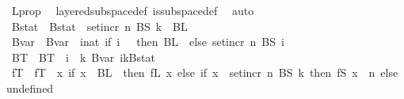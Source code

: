 \begin{isabellebody}
\ L{\isacharunderscore}{\kern0pt}prop\ \isamarkupfalse%
\ layered{\isacharunderscore}{\kern0pt}subspace{\isacharunderscore}{\kern0pt}def\ is{\isacharunderscore}{\kern0pt}subspace{\isacharunderscore}{\kern0pt}def\ \isamarkupfalse%
\ auto\isanewline
\isanewline
\ \ \ \ \isamarkupfalse%
\ Bstat\ \ {\isachardoublequoteopen}Bstat\ {\isasymequiv}\ set{\isacharunderscore}{\kern0pt}incr\ n\ {\isacharparenleft}{\kern0pt}BS\ k{\isacharparenright}{\kern0pt}\ {\isasymunion}\ BL\ {}{\isachardoublequoteclose}\isanewline
\ \ \ \ \isamarkupfalse%
\ Bvar\ \ {\isachardoublequoteopen}Bvar\ {\isasymequiv}\ {\isacharparenleft}{\kern0pt}{\isasymlambda}i{\isacharcolon}{\kern0pt}{\isacharcolon}{\kern0pt}nat{\isachardot}{\kern0pt}\ {\isacharparenleft}{\kern0pt}if\ i\ {\isacharequal}{\kern0pt}\ {}\ then\ BL\ {}\ else\ set{\isacharunderscore}{\kern0pt}incr\ n\ {\isacharparenleft}{\kern0pt}BS\ {\isacharparenleft}{\kern0pt}i\ {\isacharminus}{\kern0pt}\ {}{\isacharparenright}{\kern0pt}{\isacharparenright}{\kern0pt}{\isacharparenright}{\kern0pt}{\isacharparenright}{\kern0pt}{\isachardoublequoteclose}\isanewline
\ \ \ \ \isamarkupfalse%
\ BT\ \ {\isachardoublequoteopen}BT\ {\isasymequiv}\ {\isacharparenleft}{\kern0pt}{\isasymlambda}i\ {\isasymin}\ {\isacharbraceleft}{\kern0pt}{\isachardot}{\kern0pt}{\isachardot}{\kern0pt}{\isacharless}{\kern0pt}k{\isacharplus}{\kern0pt}{}{\isacharbraceright}{\kern0pt}{\isachardot}{\kern0pt}\ Bvar\ i{\isacharparenright}{\kern0pt}{\isacharparenleft}{\kern0pt}{\isacharparenleft}{\kern0pt}k{\isacharplus}{\kern0pt}{}{\isacharparenright}{\kern0pt}{\isacharcolon}{\kern0pt}{\isacharequal}{\kern0pt}Bstat{\isacharparenright}{\kern0pt}{\isachardoublequoteclose}\isanewline
\ \ \ \ \isamarkupfalse%
\ fT\ \ {\isachardoublequoteopen}fT\ {\isasymequiv}\ {\isacharparenleft}{\kern0pt}{\isasymlambda}x{\isachardot}{\kern0pt}\ {\isacharparenleft}{\kern0pt}if\ x\ {\isasymin}\ BL\ {}\ then\ fL\ x\ else\ {\isacharparenleft}{\kern0pt}if\ x\ {\isasymin}\ set{\isacharunderscore}{\kern0pt}incr\ n\ {\isacharparenleft}{\kern0pt}BS\ k{\isacharparenright}{\kern0pt}\ then\ fS\ {\isacharparenleft}{\kern0pt}x\ {\isacharminus}{\kern0pt}\ n{\isacharparenright}{\kern0pt}\ else\ undefined{\isacharparenright}{\kern0pt}{\isacharparenright}{\kern0pt}{\isacharparenright}{\kern0pt}{\isachardoublequoteclose}\isanewline
\isanewline
\ \ \ \ \isamarkupfalse%

\end{isabellebody}
